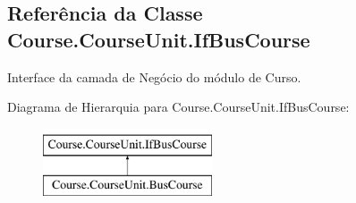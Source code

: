 \hypertarget{classCourse_1_1CourseUnit_1_1IfBusCourse}{}\subsection{Referência da Classe Course.\+Course\+Unit.\+If\+Bus\+Course}
\label{classCourse_1_1CourseUnit_1_1IfBusCourse}


Interface da camada de Negócio do módulo de Curso.  


Diagrama de Hierarquia para Course.\+Course\+Unit.\+If\+Bus\+Course\+:\begin{figure}[H]
\begin{center}
\leavevmode
\includegraphics[height=2.000000cm]{d0/d28/classCourse_1_1CourseUnit_1_1IfBusCourse}
\end{center}
\end{figure}
